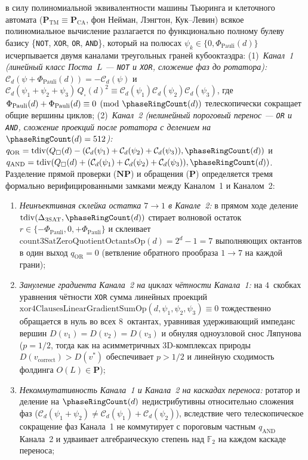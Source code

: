 \begin{theorem}
\begin{enumerate}[label=\textbf{(\roman*)},leftmargin=*]
\begin{itemize}[noitemsep,leftmargin=*]
    в силу полиномиальной эквивалентности машины Тьюринга и клеточного автомата ($\mathbf{P}_{\mathrm{TM}}\equiv\mathbf{P}_{\mathrm{CA}}$, фон Нейман, Лэнгтон, Кук--Левин) всякое полиномиальное вычисление разлагается по функционально полному булеву базису \{\texttt{NOT}, \texttt{XOR}, \texttt{OR}, \texttt{AND}\}, который на полюсах $\psi_k\in\{0,\Phi_{\mathrm{Pauli}}(d)\}$ исчерпывается двумя каналами треугольных граней кубооктаэдра:
    (1)~\emph{Канал~1 (линейный класс Поста~$L$ --- \texttt{NOT} и \texttt{XOR}, сложение фаз до ротатора):} $\mathcal{C}_d(\psi+\Phi_{\mathrm{Pauli}}(d))=-\mathcal{C}_d(\psi)$ и $\mathcal{C}_d(\psi_1+\psi_2+\psi_3)\,Q_\square(d)^2 \equiv \mathcal{C}_d(\psi_1)\mathcal{C}_d(\psi_2)\mathcal{C}_d(\psi_3)$, где $\Phi_{\mathrm{Pauli}}(d)+\Phi_{\mathrm{Pauli}}(d)\equiv 0\pmod{\phaseRingCount(d)}$ телескопически сокращает общие вершины циклов;
    (2)~\emph{Канал~2 (нелинейный пороговый перенос --- \texttt{OR} и \texttt{AND}, сложение проекций после ротатора с делением на $\phaseRingCount(d)=512$):} $q_{\mathrm{OR}} = \mathrm{tdiv}(Q_\square(d)-(\mathcal{C}_d(\psi_1)+\mathcal{C}_d(\psi_2)+\mathcal{C}_d(\psi_3)),\phaseRingCount(d))$ и $q_{\mathrm{AND}} = \mathrm{tdiv}(Q_\square(d)+(\mathcal{C}_d(\psi_1)+\mathcal{C}_d(\psi_2)+\mathcal{C}_d(\psi_3)),\phaseRingCount(d))$.
    Разделение прямой проверки ($\mathbf{NP}$) и обращения ($\mathbf{P}$) определяется тремя формально верифицированными замками между Каналом~1 и Каналом~2:
    \begin{enumerate}[label=(\alph*),noitemsep]
    \item \emph{Неинъективная склейка остатка $7\to 1$ в Канале~2:} в прямом ходе деление $\mathrm{tdiv}(\Delta_{\mathrm{3SAT}},\phaseRingCount(d))$ стирает волновой остаток $r\in\{-\Phi_{\mathrm{Pauli}},0,+\Phi_{\mathrm{Pauli}}\}$ и склеивает $\mathrm{count3SatZeroQuotientOctantsOp}(d) = 2^d-1 = 7$ выполняющих октантов в один выход $q_{\mathrm{OR}}=0$ (ветвление обратного прообраза $1\to 7$ на каждой грани);
    \item \emph{Зануление градиента Канала~2 на циклах чётности Канала~1:} на $4$~скобках уравнения чётности \texttt{XOR} сумма линейных проекций $\mathrm{xor4ClausesLinearGradientSumOp}(d,\psi_1,\psi_2,\psi_3)\equiv 0$ тождественно обращается в нуль во всех $8$~октантах, уравнивая удерживающий импеданс вершин $D(v_1)=D(v_2)=D(v_3)$ и обнуляя одноузловой снос Ляпунова ($p=1/2$, тогда как на асимметричных 3D-комплексах природы $D(v_{\mathrm{correct}})>D(v^*)$ обеспечивает $p>1/2$ и линейную сходимость фолдинга $O(L)\in\mathbf{P}$);
    \item \emph{Некоммутативность Канала~1 и Канала~2 на каскадах переноса:} ротатор и деление на $\phaseRingCount(d)$ недистрибутивны относительно сложения фаз ($\mathcal{C}_d(\psi_1+\psi_2)\ne\mathcal{C}_d(\psi_1)+\mathcal{C}_d(\psi_2)$), вследствие чего телескопическое сокращение фаз Канала~1 не коммутирует с пороговым частным $q_{\mathrm{AND}}$ Канала~2 и удваивает алгебраическую степень над $\mathbb{F}_2$ на каждом каскаде переноса;

\end{enumerate}
\end{itemize}
\end{enumerate}
\end{theorem}
